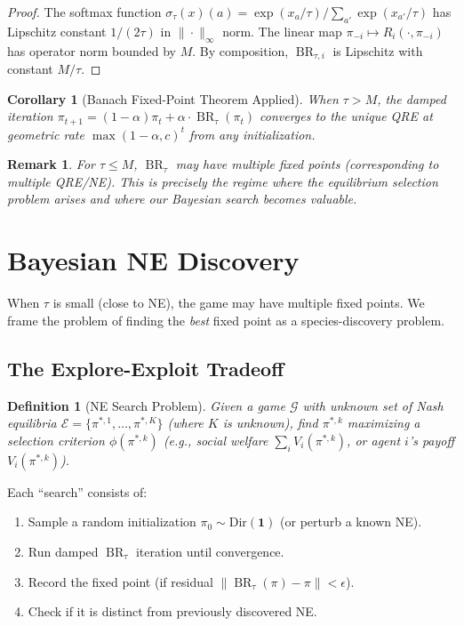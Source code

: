 \documentclass[11pt,a4paper]{article}
\newtheorem{corollary}[theorem]{Corollary}
\newtheorem{definition}[theorem]{Definition}
\newtheorem{remark}[theorem]{Remark}
\DeclareMathOperator{\BR}{BR}
\begin{document}
\begin{proof}
The softmax function $\sigma_\tau(x)(a) = \exp(x_a/\tau) / \sum_{a'} \exp(x_{a'}/\tau)$
has Lipschitz constant $1/(2\tau)$ in $\|\cdot\|_\infty$ norm.
The linear map $\pi_{-i} \mapsto R_i(\cdot, \pi_{-i})$ has operator norm bounded by $M$.
By composition, $\BR_{\tau,i}$ is Lipschitz with constant $M/\tau$.
\end{proof}

\begin{corollary}[Banach Fixed-Point Theorem Applied]
When $\tau > M$, the damped iteration
$\pi_{t+1} = (1-\alpha)\pi_t + \alpha \cdot \BR_\tau(\pi_t)$ converges
to the unique QRE at geometric rate $\max(1-\alpha, c)^t$ from any initialization.
\end{corollary}

\begin{remark}
For $\tau \leq M$, $\BR_\tau$ may have multiple fixed points (corresponding
to multiple QRE/NE). This is precisely the regime where the
\emph{equilibrium selection problem} arises and where our Bayesian search
becomes valuable.
\end{remark}


\section{Bayesian NE Discovery}
\label{sec:bayesian}

When $\tau$ is small (close to NE), the game may have multiple fixed
points. We frame the problem of finding the \emph{best} fixed point
as a species-discovery problem.

\subsection{The Explore-Exploit Tradeoff}

\begin{definition}[NE Search Problem]
Given a game $\mathcal{G}$ with unknown set of Nash equilibria
$\mathcal{E} = \{\pi^{*,1}, \ldots, \pi^{*,K}\}$ (where $K$ is unknown),
find $\pi^{*,k}$ maximizing a selection criterion $\phi(\pi^{*,k})$
(e.g., social welfare $\sum_i V_i(\pi^{*,k})$, or agent $i$'s payoff $V_i(\pi^{*,k})$).
\end{definition}

Each ``search'' consists of:
\begin{enumerate}
    \item Sample a random initialization $\pi_0 \sim \text{Dir}(\mathbf{1})$
    (or perturb a known NE).
    \item Run damped $\BR_\tau$ iteration until convergence.
    \item Record the fixed point (if residual $\|\BR_\tau(\pi) - \pi\| < \epsilon$).
    \item Check if it is distinct from previously discovered NE.
\end{enumerate}
\end{document}
